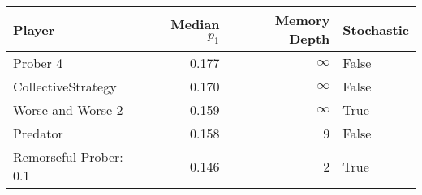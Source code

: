 \begin{tabular}{lrrl}
\toprule
                 Player &  Median $p_1$ &  Memory Depth & Stochastic \\
\midrule
               Prober 4 &         0.177 &            \(\infty\) &      False \\
     CollectiveStrategy &         0.170 &            \(\infty\) &      False \\
      Worse and Worse 2 &         0.159 &            \(\infty\) &       True \\
               Predator &         0.158 &             9 &      False \\
 Remorseful Prober: 0.1 &         0.146 &             2 &       True \\
\bottomrule
\end{tabular}
